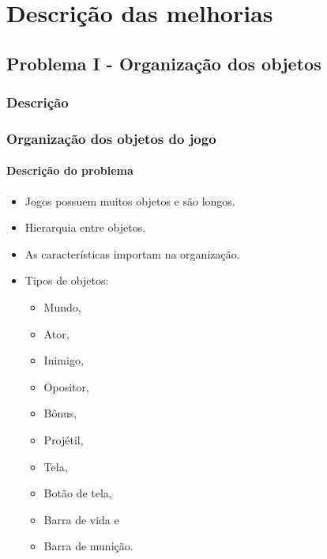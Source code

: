 \documentclass{beamer}
\begin{document}
   \section{Descrição das melhorias}
   \subsection{Problema I - Organização dos objetos}
   \subsubsection{Descrição}
   \begin{frame}
      \frametitle{Organização dos objetos do jogo}
      \framesubtitle{Descrição do problema}
      \begin{itemize}
         \item Jogos possuem muitos objetos e são longos.
         \item Hierarquia entre objetos.
         \item As características importam na organização.
         \item Tipos de objetos:
            \begin{multicols}{2}
               \begin{itemize}
                  \item Mundo,
                  \item Ator,
                  \item Inimigo,
                  \item Opositor,
                  \item Bônus,
                  \item Projétil,
                  \item Tela,
                  \item Botão de tela,
                  \item Barra de vida e
                  \item Barra de munição.
               \end{itemize}
            \end{multicols}
      \end{itemize}
   \end{frame}
\end{document}
